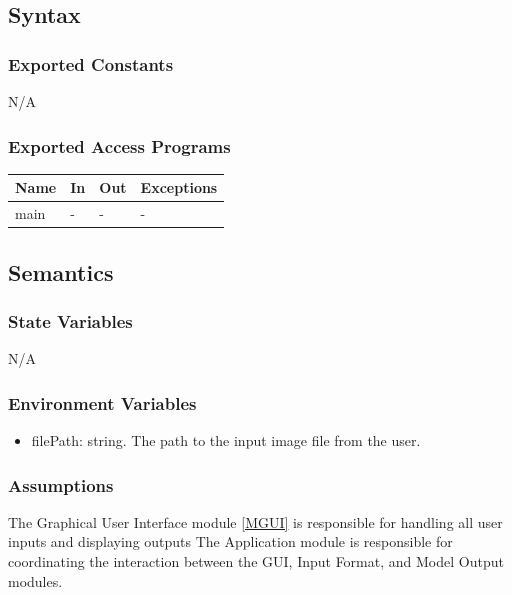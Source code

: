 \documentclass[12pt, titlepage]{article}
\begin{document}
\subsection{Syntax}

\subsubsection{Exported Constants}

N/A

\subsubsection{Exported Access Programs}

\begin{center}
\begin{tabular}{p{2cm} p{4cm} p{4cm} p{2cm}}
\hline
\textbf{Name} & \textbf{In} & \textbf{Out} & \textbf{Exceptions} \\
\hline
main & - & - & - \\
\hline
\end{tabular}
\end{center}

\subsection{Semantics}

\subsubsection{State Variables}

N/A

\subsubsection{Environment Variables}

\begin{itemize}
  \item filePath: string. The path to the input image file from the user.
\end{itemize}

\subsubsection{Assumptions}

The Graphical User Interface module \ref{MGUI} is responsible for handling all
user inputs and displaying outputs The Application module is responsible for
coordinating the interaction between the GUI, Input Format, and Model Output
modules.
\end{document}
